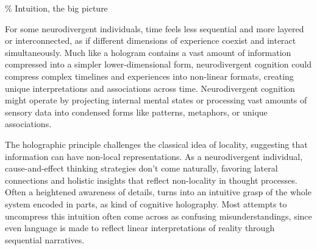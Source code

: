 
{\scriptsize \textcolor{comment}{\% Intuition, the big picture }}

For some neurodivergent individuals, time feels less sequential and more layered or interconnected, as if different dimensions of experience coexist and interact simultaneously. Much like a hologram contains a vast amount of information compressed into a simpler lower-dimensional form, neurodivergent cognition could compress complex timelines and experiences into non-linear formats, creating unique interpretations and associations across time.
Neurodivergent cognition might operate by projecting internal mental states or processing vast amounts of sensory data into condensed forms like patterns, metaphors, or unique associations. 

The holographic principle challenges the classical idea of locality, suggesting that information can have non-local representations. As a neurodivergent individual, cause-and-effect thinking strategies don't come naturally, favoring lateral connections and holistic insights that reflect non-locality in thought processes. Often a heightened awareness of details, turns into an intuitive grasp of the whole system encoded in parts, as kind of cognitive holography. Most attempts to uncompress this intuition often come across as confusing misunderstandings, since even language is made to reflect linear interpretations of reality through sequential narratives.

